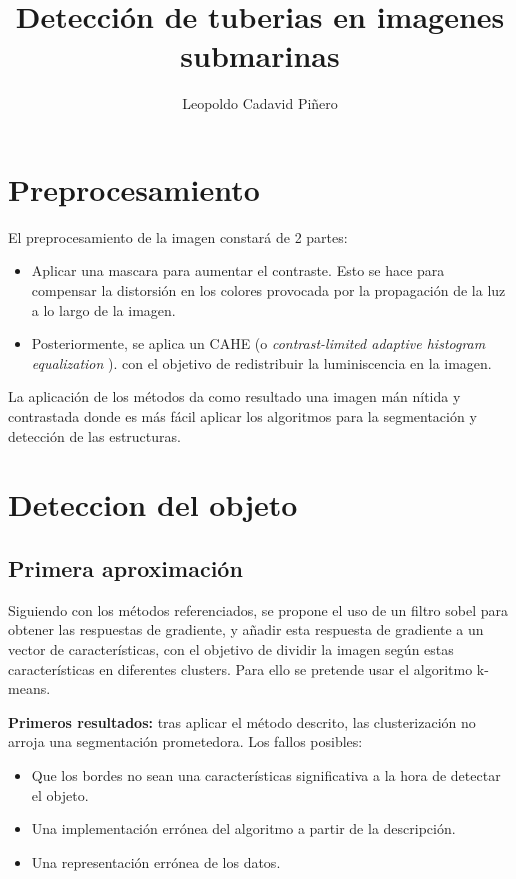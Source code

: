 \documentclass[12pt, a4paper]{article}
\title{Detección de tuberias en imagenes submarinas} \\
\author{
Leopoldo Cadavid Piñero
}
\begin{document}
\maketitle
\newpage
\tableofcontents
\newpage

      


\section{Preprocesamiento}

El preprocesamiento de la imagen constará de 2 partes:

\begin{itemize}
    
    \item Aplicar una mascara para aumentar el contraste. Esto se hace para compensar
    la distorsión en los colores provocada por la propagación de la luz a lo largo de la imagen.
    


    \item Posteriormente, se aplica un CAHE (o \textit{contrast-limited adaptive histogram equalization} ).
    con el objetivo de redistribuir la luminiscencia en la imagen. 
    
    

\end{itemize}

La aplicación de los métodos da como resultado una imagen mán nítida y contrastada
 donde es más fácil aplicar los algoritmos para la segmentación y detección de las estructuras.


\section{Deteccion del objeto}

\subsection{Primera aproximación}

Siguiendo con los métodos referenciados, se propone el uso de un filtro sobel para obtener
las respuestas de gradiente, y añadir esta respuesta de gradiente a un vector de características,
con el objetivo de dividir la imagen según estas características en diferentes clusters. Para ello se pretende usar el algoritmo
k-means. 

\textbf{Primeros resultados:} tras aplicar el método descrito, las clusterización no arroja una segmentación prometedora.
Los fallos posibles:
\begin{itemize}
    \item Que los bordes no sean una características significativa a la hora de detectar
    el objeto. 

    \item Una implementación errónea del algoritmo a partir de la descripción. 
    \item Una representación errónea de los datos.
\end{itemize}
\end{document}
